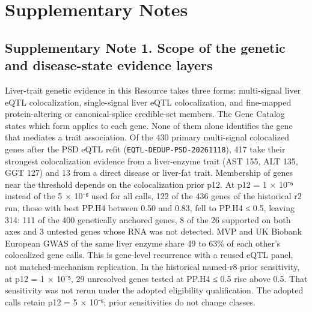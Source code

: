 \section{Supplementary Notes}\label{supplementary-notes}

\subsection{Supplementary Note 1. Scope of the genetic and disease-state evidence layers}\label{supplementary-note-1.-scope-of-the-genetic-and-disease-state-evidence-layers}

Liver-trait genetic evidence in this Resource takes three forms: multi-signal liver eQTL colocalization, single-signal liver eQTL colocalization, and fine-mapped protein-altering or canonical-splice credible-set members. The Gene Catalog states which form applies to each gene. None of them alone identifies the gene that mediates a trait association. Of the 430 primary multi-signal colocalized genes after the PSD eQTL refit (\texttt{EQTL-DEDUP-PSD-20261118}), 417 take their strongest colocalization evidence from a liver-enzyme trait (AST 155, ALT 135, GGT 127) and 13 from a direct disease or liver-fat trait. Membership of genes near the threshold depends on the colocalization prior p12. At p12 = 1 × 10⁻⁶ instead of the 5 × 10⁻⁶ used for all calls, 122 of the 436 genes of the historical r2 run, those with best PP.H4 between 0.50 and 0.83, fell to PP.H4 ≤ 0.5, leaving 314: 111 of the 400 genetically anchored genes, 8 of the 26 supported on both axes and 3 untested genes whose RNA was not detected. MVP and UK Biobank European GWAS of the same liver enzyme share 49 to 63\% of each other's colocalized gene calls. This is gene-level recurrence with a reused eQTL panel, not matched-mechanism replication. In the historical named-r8 prior sensitivity, at p12 = 1 × 10⁻⁵, 29 unresolved genes tested at PP.H4 ≤ 0.5 rise above 0.5. That sensitivity was not rerun under the adopted eligibility qualification. The adopted calls retain p12 = 5 × 10⁻⁶; prior sensitivities do not change classes.

